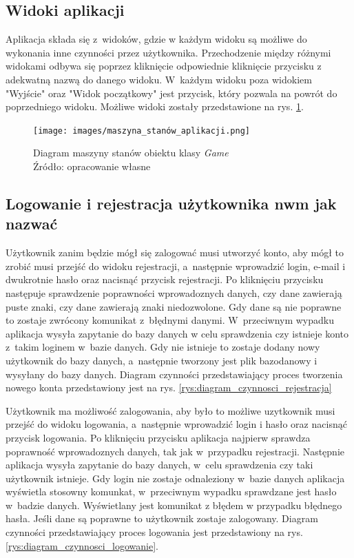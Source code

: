 \documentclass[12pt,a4paper]{article} %
\begin{document}
\subsection{Widoki aplikacji}
\aka Aplikacja składa się z~widoków, gdzie w każdym widoku są możliwe do wykonania inne czynności przez użytkownika. Przechodzenie między różnymi widokami odbywa się poprzez kliknięcie odpowiednie kliknięcie przycisku z adekwatną nazwą do danego widoku. W~każdym widoku poza widokiem "Wyjście" oraz "Widok początkowy" jest przycisk, który pozwala na powrót do poprzedniego widoku. Możliwe widoki zostały przedstawione na rys. \ref{rys:diagram_maszyny_stanów}.


\begin{figure}[h]
	\centering
	\texttt{[image: images/maszyna\_stanów\_aplikacji.png]}
	\caption{Diagram maszyny stanów obiektu klasy \textit{Game} \\ Źródło: opracowanie własne}
	\label{rys:diagram_maszyny_stanów}
\end{figure}

\subsection{Logowanie i rejestracja użytkownika nwm jak nazwać}
\aka Użytkownik zanim będzie mógł się zalogować musi utworzyć konto, aby mógł to zrobić musi przejść do widoku rejestracji, a~następnie wprowadzić login, e-mail i dwukrotnie hasło oraz nacisnąć przycisk rejestracji. Po kliknięciu przycisku następuje sprawdzenie poprawności wprowadoznych danych, czy dane zawierają puste znaki, czy dane zawierają znaki niedozwolone. Gdy dane są nie poprawne to zostaje zwrócony komunikat z~błędnymi danymi. W~przeciwnym wypadku aplikacja wysyła zapytanie do bazy danych w celu sprawdzenia czy istnieje konto z~takim loginem w~bazie danych. Gdy nie istnieje to zostaje dodany nowy użytkownik do bazy danych, a~następnie tworzony jest plik bazodanowy i wysyłany do bazy danych.
Diagram czynności przedstawiający proces tworzenia nowego konta przedstawiony jest na rys. \ref{rys:diagram_czynnosci_rejestracja}

\aka Użytkownik ma możliwość zalogowania, aby było to możliwe uzytkownik musi przejść do widoku logowania, a~następnie wprowadzić login i hasło oraz nacisnąć przycisk logowania. Po kliknięciu przycisku aplikacja najpierw sprawdza poprawność wprowadoznych danych, tak jak w~przypadku rejestracji. Następnie aplikacja wysyła zapytanie do bazy danych, w~celu sprawdzenia czy taki użytkownik istnieje. Gdy login nie zostaje odnaleziony w~bazie danych aplikacja wyświetla stosowny komunkat, w~przeciwnym wypadku sprawdzane jest hasło w~badzie danych. Wyświetlany jest komunikat z błędem w przypadku błędnego hasła. Jeśli dane są poprawne to użytkownik zostaje zalogowany. Diagram czynności przedstawiający proces logowania jest przedstawiony na rys. \ref{rys:diagram_czynnosci_logowanie}.
\end{document}
